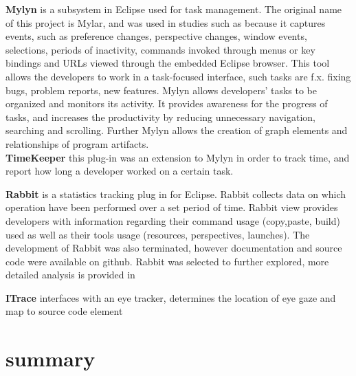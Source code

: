 \textbf{Mylyn} is a subsystem in Eclipse used for task management. The original name of this project is Mylar, and was used in studies such as 
because it captures events, such as preference changes, 
perspective changes, window events, selections, periods of inactivity, commands invoked through menus or key bindings and URLs viewed through the embedded Eclipse browser.
This tool allows the developers to work in a task-focused interface, such tasks are f.x. fixing bugs, problem reports, new features.
Mylyn allows developers' tasks to be organized and monitors its activity. It provides awareness for the progress of tasks, and increases the productivity by reducing unnecessary navigation, searching and scrolling.
Further Mylyn allows the creation of graph elements and relationships of program artifacts.\\
\textbf{TimeKeeper} this plug-in was an extension to Mylyn in order to track time, and report how long a developer worked on a certain task.

\textbf{Rabbit} is a statistics tracking plug in for Eclipse. Rabbit collects data on which operation have been performed over a set period of time.
Rabbit view provides developers with information regarding their command usage (copy,paste, build) 
used as well as their tools usage (resources, perspectives, launches). The development of Rabbit was also terminated, however documentation and source code were available on github.
Rabbit was selected to further explored, more detailed analysis is provided in %

\textbf{ITrace} interfaces with an eye tracker, determines the location of eye
gaze and map to source code element

\section{summary}
